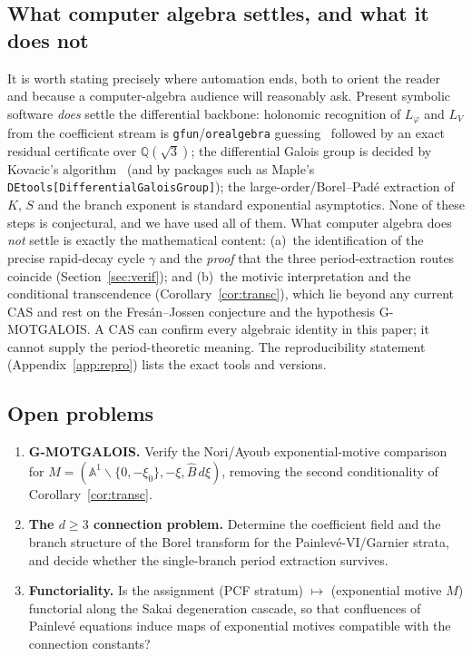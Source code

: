 \documentclass[11pt,reqno]{amsart}
\renewcommand{\_}{\vquadorigunderscore\allowbreak}
\theoremstyle{plain}
\theoremstyle{definition}
\newcommand{\Bhat}{\widehat{B}}
\newcommand{\Lphi}{L_{\varphi}}
\newcommand{\LV}{L_{V}}
\newcommand{\Qsqrt}{\mathbb{Q}(\sqrt3)}
\newcommand{\xizero}{\xi_0}
\begin{document}
\subsection{What computer algebra settles, and what it does not}
It is worth stating precisely where automation ends, both to orient the reader and because a
computer-algebra audience will reasonably ask. Present symbolic software \emph{does} settle the
differential backbone: holonomic recognition of $\Lphi$ and $\LV$ from the coefficient stream is
\texttt{gfun}/\texttt{ore\_algebra} guessing~\cite{gfun,oreAlgebra} followed by an exact residual
certificate over $\Qsqrt$; the differential Galois group is decided by Kovacic's
algorithm~\cite{Kovacic} (and by packages such as Maple's
\texttt{DEtools[DifferentialGaloisGroup]}); the large-order/Borel--Pad\'e extraction of $K$, $S$
and the branch exponent is standard exponential asymptotics. None of these steps is conjectural,
and we have used all of them. What computer algebra does \emph{not} settle is exactly the
mathematical content: (a)~the identification of the precise rapid-decay cycle $\gamma$ and the
\emph{proof} that the three period-extraction routes coincide (Section~\ref{sec:verif}); and
(b)~the motivic interpretation and the conditional transcendence
(Corollary~\ref{cor:transc}), which lie beyond any current CAS and rest on the Fres\'an--Jossen
conjecture and the hypothesis G-MOTGALOIS. A CAS can confirm every algebraic identity in this
paper; it cannot supply the period-theoretic meaning. The reproducibility statement
(Appendix~\ref{app:repro}) lists the exact tools and versions.

\subsection{Open problems}
\begin{enumerate}[leftmargin=1.6em,itemsep=2pt]
  \item \textbf{G-MOTGALOIS.} Verify the Nori/Ayoub exponential-motive comparison for
        $M=(\mathbb{A}^1\smallsetminus\{0,-\xizero\},-\xi,\Bhat\,d\xi)$, removing the second
        conditionality of Corollary~\ref{cor:transc}.
  \item \textbf{The $d\ge3$ connection problem.} Determine the coefficient field and the branch
        structure of the Borel transform for the Painlev\'e-VI/Garnier strata, and decide whether
        the single-branch period extraction survives.
  \item \textbf{Functoriality.} Is the assignment (PCF stratum) $\mapsto$ (exponential motive
        $M$) functorial along the Sakai degeneration cascade, so that confluences of Painlev\'e
        equations induce maps of exponential motives compatible with the connection constants?
\end{enumerate}
\end{document}
